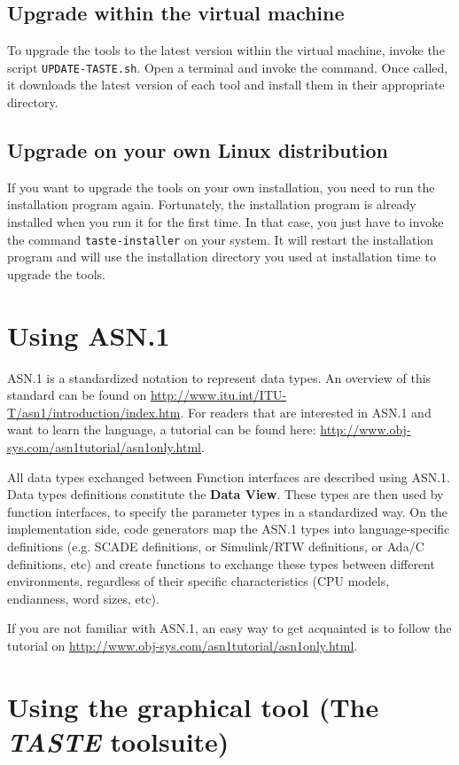 \documentclass[11pt]{book}
\begin{document}
   \section{Upgrade within the virtual machine}
   To upgrade the tools to the latest version within the virtual machine, invoke
   the script \texttt{UPDATE-TASTE.sh}. Open a terminal and invoke the command.
   Once called, it downloads the latest version of each tool and install them in
   their appropriate directory.


   \section{Upgrade on your own Linux distribution}
   If you want to upgrade the tools on your own installation, you need to run
   the installation program again. Fortunately, the installation program is
   already installed when you run it for the first time. In that case, you just
   have to invoke the command \texttt{taste-installer} on your system. It will
   restart the installation program and will use the installation directory you
   used at installation time to upgrade the tools.


\chapter{Using ASN.1}
ASN.1 is a standardized notation to represent data types. An overview of this
standard can be found on
\url{http://www.itu.int/ITU-T/asn1/introduction/index.htm}. For readers that are
interested in ASN.1 and want to learn the language, a tutorial can be found here: 
\url{http://www.obj-sys.com/asn1tutorial/asn1only.html}.

All data types exchanged between Function interfaces are described using ASN.1.
Data types definitions constitute the \textbf{Data View}. These types are
then used by function interfaces, to specify the parameter types in a 
standardized way. On the implementation side, code generators map 
the ASN.1 types into language-specific definitions (e.g. SCADE definitions, or
Simulink/RTW definitions, or Ada/C definitions, etc) and create
functions to exchange these types between different environments, regardless of their
specific characteristics (CPU models, endianness, word sizes, etc).

If you are not familiar with ASN.1, an easy way to get acquainted is to follow the
tutorial on \url{http://www.obj-sys.com/asn1tutorial/asn1only.html}.

\chapter{Using the graphical tool (The \textit{TASTE} toolsuite)}
\end{document}

